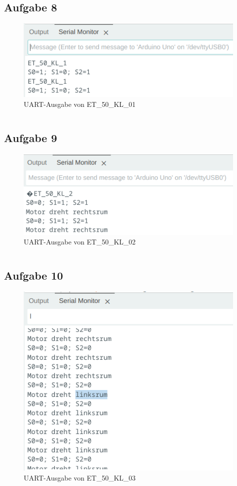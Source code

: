 \documentclass{article}
\begin{document}
\clearpage
\subsection{Aufgabe 8}
\begin{figure}[H]
    \centering
    \includegraphics[width=0.75\linewidth]{ET_50_KL_01.png}
    \caption{UART-Ausgabe von ET\_50\_KL\_01}
\end{figure}
\inputminted[linenos]{c++}{res/code/ET_50_KL_01.c}

\clearpage
\subsection{Aufgabe 9}
\begin{figure}[H]
    \centering
    \includegraphics[width=0.75\linewidth]{ET_50_KL_02.png}
    \caption{UART-Ausgabe von ET\_50\_KL\_02}
\end{figure}
\inputminted[linenos]{c++}{res/code/ET_50_KL_02.c}

\clearpage
\subsection{Aufgabe 10}
\begin{figure}[H]
    \centering
    \includegraphics[width=0.75\linewidth]{ET_50_KL_03.png}
    \caption{UART-Ausgabe von ET\_50\_KL\_03}
\end{figure}
\inputminted[linenos]{c++}{res/code/ET_50_KL_03.c}
\end{document}
